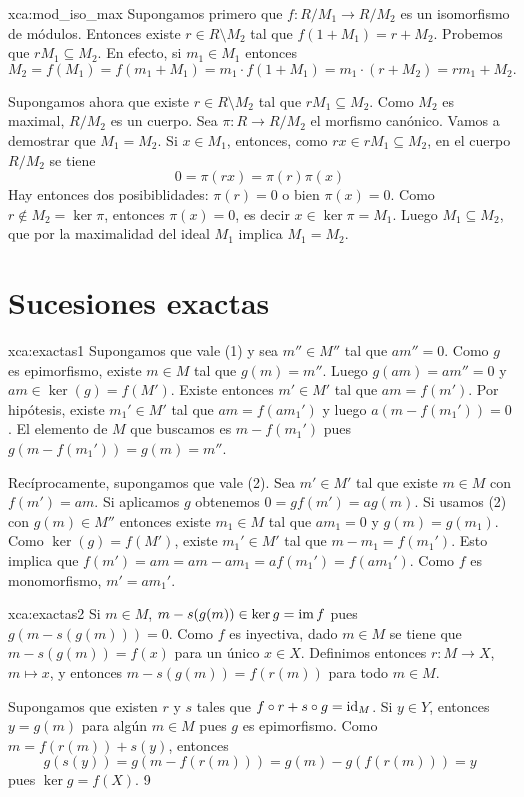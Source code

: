 \begin{sol}{xca:mod_iso_max}
    Supongamos primero que $f\colon R/M_1\to R/M_2$ es un isomorfismo de
    módulos. Entonces existe $r\in R\setminus M_2$ tal que $f(1+M_1)=r+M_2$.
    Probemos que $rM_1\subseteq M_2$. En efecto, si $m_1\in M_1$ entonces
    \[
    M_2=f(M_1)=f(m_1+M_1)=m_1\cdot f(1+M_1)=m_1\cdot (r+M_2)=rm_1+M_2. 
    \]
    
    Supongamos ahora que existe $r\in R\setminus M_2$ tal que
    $rM_1\subseteq M_2$.  Como $M_2$ es maximal, $R/M_2$ es un cuerpo. Sea $\pi\colon R\to R/M_2$ el morfismo canónico. Vamos
    a demostrar que $M_1=M_2$. Si $x\in M_1$, entonces, como $rx\in rM_1\subseteq M_2$, en el cuerpo $R/M_2$ se tiene  
    \[
    0=\pi(rx)=\pi(r)\pi(x)
    \]
    Hay entonces dos posibiblidades: $\pi(r)=0$ o bien $\pi(x)=0$. Como $r\not\in M_2=\ker\pi$, 
    entonces $\pi(x)=0$, es decir $x\in\ker \pi=M_1$. Luego $M_1\subseteq M_2$, que por la maximalidad
    del ideal $M_1$ implica $M_1=M_2$. 
\end{sol}


\section*{Sucesiones exactas}

\begin{sol}{xca:exactas1}
			Supongamos que vale (1) y sea $m''\in M''$ tal que $am''=0$. Como $g$ es
			epimorfismo, existe $m\in M$ tal que $g(m)=m''$. Luego $g(am)=am''=0$ y
			$am\in\ker(g)=f(M')$. Existe entonces $m'\in M'$ tal que $am=f(m')$. Por
			hipótesis, existe $m_1'\in M'$ tal que $am=f(am_1')$ y luego
			$a(m-f(m_1'))=0$. El elemento de $M$ que buscamos es $m-f(m_1')$ pues
			$g(m-f(m_1'))=g(m)=m''$.

			Recíprocamente, supongamos que vale (2). Sea $m'\in M'$ tal que existe
			$m\in M$ con $f(m')=am$. Si aplicamos $g$ obtenemos $0=gf(m')=ag(m)$. Si
			usamos (2) con $g(m)\in M''$ entonces existe $m_1\in M$ tal que $am_1=0$
			y $g(m)=g(m_1)$. Como $\ker(g)=f(M')$, existe $m_1'\in M'$ tal que
			$m-m_1=f(m_1')$. Esto implica que $f(m')=am=am-am_1=af(m_1')=f(am_1')$.
			Como $f$ es monomorfismo, $m'=am_1'$.
\end{sol}

\begin{sol}{xca:exactas2}	
	Si $m\in M$, $m-s(g(m))\in\ker g=\operatorname{im} f$ pues
	$g(m-s(g(m)))=0$. Como $f$ es inyectiva, dado $m\in M$ se tiene que 
	$m-s(g(m))=f(x)$ para un único $x\in X$. Definimos entonces
	$r\colon M\to X$, $m\mapsto x$, y entonces
	$m-s(g(m))=f(r(m))$ para todo $m\in M$.

	Supongamos que existen $r$ y $s$ tales que $f\circ r+s\circ g=\operatorname{id}_M$. Si $y\in Y$, entonces $y=g(m)$ 
	para algún $m\in M$ pues $g$ es epimorfismo. Como $m=f(r(m))+s(y)$, entonces
	\[
	g(s(y))=g(m-f(r(m)))=g(m)-g(f(r(m)))=y
	\]
	pues $\ker g=f(X)$. 
	9 
\end{sol}

